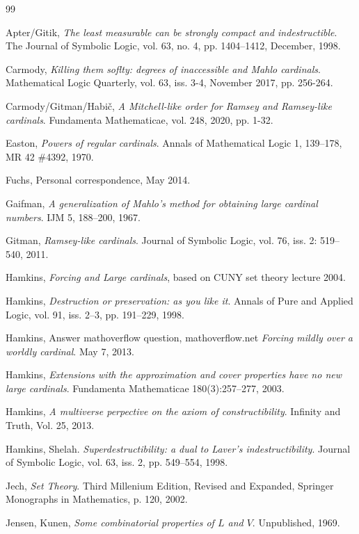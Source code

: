 \documentclass[10pt,leqno]{amsart}
\begin{document}
\begin{thebibliography}{99}

Apter/Gitik, \emph{The least measurable can be strongly compact and indestructible}.
The Journal of Symbolic Logic, vol. 63, no. 4, pp. 1404--1412, December, 1998.

Carmody, \emph{Killing them soflty: degrees of inaccessible and Mahlo cardinals}. 
Mathematical Logic Quarterly, vol. 63, iss. 3-4, November 2017, pp. 256-264.

Carmody/Gitman/Habič, \emph{A Mitchell-like order for Ramsey and Ramsey-like cardinals}.
Fundamenta Mathematicae, vol. 248, 2020, pp. 1-32.


Easton, \emph{Powers of regular cardinals}.
Annals of Mathematical Logic 1, 139--178, MR 42 \#4392, 1970.

Fuchs, Personal correspondence, May 2014.

Gaifman, \emph{A generalization of Mahlo’s method for obtaining large cardinal numbers}.
IJM 5, 188--200, 1967.

Gitman, \emph{Ramsey-like cardinals}.
Journal of Symbolic Logic, vol. 76, iss. 2: 519--540, 2011.

Hamkins, \emph{Forcing and Large cardinals}, based on CUNY set theory lecture 2004.

Hamkins, \emph{Destruction or preservation: as you like it}.
Annals of Pure and Applied Logic, vol. 91, iss. 2--3, pp. 191--229, 1998.

Hamkins, Answer mathoverflow question, mathoverflow.net
\emph{Forcing mildly over a worldly cardinal}. May 7, 2013.

Hamkins, \emph{Extensions with the approximation and cover properties have no new large cardinals}.
Fundamenta Mathematicae 180(3):257--277, 2003.

Hamkins, \emph{A multiverse perpective on the axiom of constructibility}.
Infinity and Truth, Vol. 25, 2013.

Hamkins, Shelah. \emph{Superdestructibility: a dual to Laver’s indestructibility}.
Journal of Symbolic Logic, vol. 63, iss. 2, pp. 549--554, 1998.

Jech, \emph{Set Theory}.
Third Millenium Edition, Revised and Expanded, Springer Monographs in Mathematics, p. 120, 2002.

Jensen, Kunen, \emph{Some combinatorial properties of $L$ and $V$}.
Unpublished, 1969.


\end{thebibliography}
\end{document}
